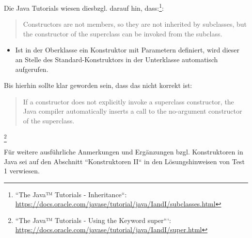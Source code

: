 Die Java Tutorials wiesen diesbzgl. darauf hin, dass:\footnote{
``The Java™ Tutorials - Inheritance``: \url{https://docs.oracle.com/javase/tutorial/java/IandI/subclasses.html}
}:~\blockquote{
Constructors are not members, so they are not inherited by subclasses, but the constructor of the superclass can be invoked from the subclass.
}

\begin{itemize}
\item Ist in der Oberklasse ein Konstruktor mit Parametern definiert, wird dieser an Stelle des Standard-Konstruktors in der Unterklasse automatisch aufgerufen.
\end{itemize}

Bis hierhin sollte klar geworden sein, dass das nicht korrekt ist:~\blockquote{
 If a constructor does not explicitly invoke a superclass constructor, the Java compiler automatically inserts a call to the no-argument constructor of the superclass.
 }\footnote{
 ``The Java™ Tutorials - Using the Keyword super```: \url{https://docs.oracle.com/javase/tutorial/java/IandI/super.html}
 }

Für weitere ausführliche Anmerkungen und Ergänzungen bzgl. Konstruktoren in Java sei auf den Abschnitt ``Konstruktoren II`` in den Lösungshinweisen von Test 1 verwiesen.